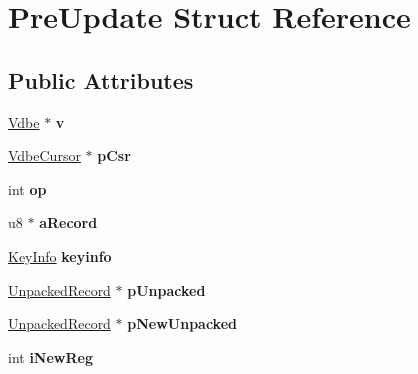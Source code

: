 \hypertarget{struct_pre_update}{}\section{Pre\+Update Struct Reference}
\label{struct_pre_update}
\subsection*{Public Attributes}
\begin{DoxyCompactItemize}
\item 
\mbox{\label{struct_pre_update_a6fccc7c418de1a789595f9814a4f5f81}} 
\mbox{\hyperlink{struct_vdbe}{Vdbe}} $\ast$ {\bfseries v}
\item 
\mbox{\label{struct_pre_update_a4716275b8f780b4f63f1a379a846c620}} 
\mbox{\hyperlink{struct_vdbe_cursor}{Vdbe\+Cursor}} $\ast$ {\bfseries p\+Csr}
\item 
\mbox{\label{struct_pre_update_aaecf3af9f7b62a4fd140d0d1300201cf}} 
int {\bfseries op}
\item 
\mbox{\label{struct_pre_update_a148cb72a74c7943828e02a5ce88ef662}} 
u8 $\ast$ {\bfseries a\+Record}
\item 
\mbox{\label{struct_pre_update_a8bb920205df3c43820a81dcd3c1cf5bb}} 
\mbox{\hyperlink{struct_key_info}{Key\+Info}} {\bfseries keyinfo}
\item 
\mbox{\label{struct_pre_update_ab43a1f36e6ab8c9aa8b1e52f1d80d07f}} 
\mbox{\hyperlink{struct_unpacked_record}{Unpacked\+Record}} $\ast$ {\bfseries p\+Unpacked}
\item 
\mbox{\label{struct_pre_update_a70c572bb14af1dfdff8a1d6619548de0}} 
\mbox{\hyperlink{struct_unpacked_record}{Unpacked\+Record}} $\ast$ {\bfseries p\+New\+Unpacked}
\item 
\mbox{\label{struct_pre_update_aadbf462d0c2b3d64387f9ece92ad2ed1}} 
int {\bfseries i\+New\+Reg}
\item 
\mbox{\label{struct_pre_update_a1d05fbd13495324e507658cd519cacbd}} 

\end{DoxyCompactItemize}
